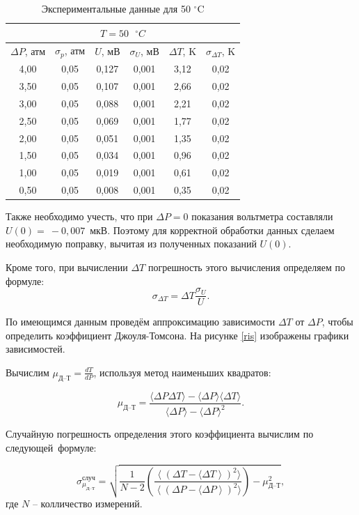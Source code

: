 \documentclass[a4paper,12pt]{article} %
\begin{document}
\begin{table}[H]
	\centering
	\begin{tabular}{|c|c|c|c|c|c|}
		\hline
		\multicolumn{6}{|c|}{$ T = 50 \text{ } ^\circ C $} \\ \hline
		$ \Delta P $, атм & $ \sigma_p $, атм & $ U $, мВ & $ \sigma_U $, мВ & $ \Delta T $, K & $ \sigma_{\Delta T} $, K \\ \hline
		4,00 & 0,05 & 0,127 & 0,001 & 3,12 & 0,02 \\ \hline
		3,50 & 0,05 & 0,107 & 0,001 & 2,66 & 0,02 \\ \hline
		3,00 & 0,05 & 0,088 & 0,001 & 2,21 & 0,02 \\ \hline
		2,50 & 0,05 & 0,069 & 0,001 & 1,77 & 0,02 \\ \hline
		2,00 & 0,05 & 0,051 & 0,001 & 1,35 & 0,02 \\ \hline
		1,50 & 0,05 & 0,034 & 0,001 & 0,96 & 0,02 \\ \hline
		1,00 & 0,05 & 0,019 & 0,001 & 0,61 & 0,02 \\ \hline
		0,50 & 0,05 & 0,008 & 0,001 & 0,35 & 0,02 \\ \hline
	\end{tabular}
	\caption{Экспериментальные данные для 50 $^\circ$C}
	\label{tab:50C}
\end{table}

Также необходимо учесть, что при $ \Delta P = 0$ показания вольтметра составляли $ U(0) =~-0,007 $~мкВ. Поэтому для корректной обработки данных сделаем необходимую поправку, вычитая из полученных показаний $ U(0) $.

Кроме того, при вычислении $ \Delta T $ погрешность этого вычисления определяем по формуле: \[ \sigma_{\Delta T} = \Delta T \frac{\sigma_U}{U}. \]

По имеющимся данным проведём аппроксимацию зависимости $ \Delta T $ от $ \Delta P $, чтобы определить коэффициент Джоуля-Томсона. На рисунке \ref{ris} изображены графики зависимостей.



Вычислим $ \mu_\text{Д--Т} = \frac{dT}{dP} $, используя метод наименьших квадратов:

\[ \mu_\text{Д--Т} = \frac{\langle \Delta P \Delta T \rangle - \langle \Delta P \rangle \langle \Delta T \rangle}{\langle \Delta P \rangle - \langle \Delta P \rangle ^2}.\]

Случайную погрешность определения этого коэффициента вычислим по следующей~формуле:

\[ \sigma^\text{случ}_{\mu_\text{Д--Т}} = \sqrt{\frac{1}{N-2} \left(\frac{\left\langle\left(\Delta T - \langle \Delta T\right\rangle\right)^2 \rangle}{\left\langle\left(\Delta P - \langle \Delta P\right\rangle\right)^2 \rangle}\right)-\mu_\text{Д--Т}^2},\] где  $ N $  -- колличество измерений.
\end{document}
